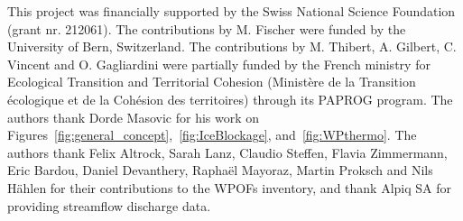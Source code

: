 This project was financially supported by the Swiss National Science Foundation (grant nr. 212061). The contributions by M. Fischer were funded by the University of Bern, Switzerland. The contributions by M. Thibert, A. Gilbert, C. Vincent and O. Gagliardini were partially funded by the French ministry for Ecological Transition and Territorial Cohesion (Ministère de la Transition écologique et de la Cohésion des territoires)  through its PAPROG program. The authors thank Dorde Masovic for his work on  Figures~\ref{fig:general_concept},~\ref{fig:IceBlockage}, and~\ref{fig:WPthermo}. The authors thank Felix Altrock, Sarah Lanz, Claudio Steffen, Flavia Zimmermann, Eric Bardou, Daniel Devanthery, Raphaël Mayoraz, Martin Proksch and Nils Hählen for their contributions to the WPOFs inventory, and thank Alpiq SA for providing streamflow discharge data.




